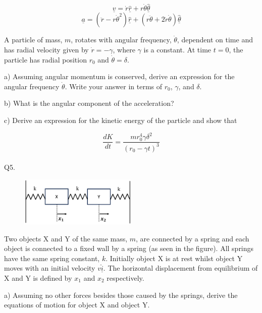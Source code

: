 \documentclass[a4paper,11pt]{article}
\begin{document}
\[ 
\underline{v} = \dot{r} \underline{\hat{r}} + r \dot{\theta} \underline{\hat{\theta}} 
\]
\[ 
\underline{a} = (\ddot{r} - r \dot{\theta}^{2}) \underline{\hat{r}} + (r \ddot{\theta} + 2\dot{r}\dot{\theta} ) \underline{\hat{\theta}} 
\]

\noindent A particle of mass, \( m \), rotates with angular frequency, \( \dot{\theta} \), dependent on time and has radial velocity given by \( \dot{r} = - \gamma \), where \( \gamma \) is a constant. At time \( t = 0 \), the particle has radial position \( r_{0} \) and \( \dot{\theta} = \delta \). 

\medskip

\noindent a) Assuming angular momentum is conserved, derive an expression for the angular frequency \( \dot{\theta} \). Write your answer in terms of \( r_{0} \), \( \gamma \), and \( \delta \).

\medskip

\noindent b) What is the angular component of the acceleration?

\medskip

\noindent c) Derive an expression for the kinetic energy of the particle and show that 

\[
\frac{dK}{dt} = \frac{m r_{0}^{4} \gamma \delta^{2}}{(r_{0} - \gamma t)^{3}}
\] \\

\noindent Q5. 

\begin{figure}[h!]
    \centering
    \includegraphics[width=0.5\textwidth]{CMq5figure.PNG}
    \caption*{}
\end{figure}

\noindent Two objects X and Y of the same mass, \( m \), are connected by a spring and each object is connected to a fixed wall by a spring (as seen in the figure). All springs have the same spring constant, \( k \). Initially object X is at rest whilst object Y moves with an initial velocity \( v \hat{\underline{i}} \). The horizontal displacement from equilibrium of X and Y is defined by \( x_{1} \) and \( x_{2} \) respectively. 

\medskip

\noindent a) Assuming no other forces besides those caused by the springs, derive the equations of motion for object X and object Y. 
\end{document}
